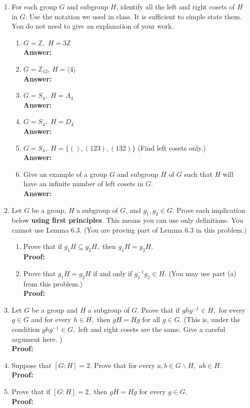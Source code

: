 \documentclass[12pt]{article}
\renewcommand{\emph}[1]{\textsf{\textbf{#1}}}
\newcommand{\bbZ}{\mathbb{Z}}
\begin{document}
\begin{enumerate}
\item For each group $G$ and subgroup $H$, identify all the left and right cosets of $H$ in $G$. Use the notation we used in class. It is sufficient to simple state them. You do not need to give an explanation of your work.\\
	\begin{enumerate}
	\item $G=\bbZ,$ $H=3\bbZ$\\
	\textbf{Answer:} 
	\vfill
	\item $G=\bbZ_{12}$, $H=\langle 4 \rangle$\\
	\textbf{Answer:} 
	\vfill
	\item $G=S_4,$ $H=A_4$\\
	\textbf{Answer:} 
	\vfill
	\item  $G=S_4,$ $H=D_4$\\
	\textbf{Answer:} 
	\vfill
	\item $G=S_4,$ $H=\{(),(123),(132)\}$ (Find left cosets only.)\\
	\textbf{Answer:} 
	\vfill
	\item Give an example of a group $G$ and subgroup $H$ of $G$ such that $H$ will have an infinite number of left cosets in $G.$\\
	\textbf{Answer:} 
	\vfill
	\end{enumerate}
\newpage
	
\item Let $G$ be a group, $H$ a subgroup of $G$, and $g_1,g_2 \in G.$ Prove each implication below \emph{using first principles}. This means you can use only definitions. You cannot use Lemma 6.3. (You are proving part of Lemma 6.3 in this problem.)
	\begin{enumerate}
	\item Prove that if $g_1H \subseteq g_2H,$ then $g_1H=g_2H.$\\
	\textbf{Proof:} 
	\vfill
	\item Prove that $g_1H = g_2H$ if and only if $g_1^{-1}g_2 \in H.$ (You may use part (a) from this problem.)\\
	\textbf{Proof:} 
	\vfill
	\end{enumerate}
\newpage

\item Let $G$ be a group and $H$ a subgroup of $G.$ Prove that if $ghg^{-1} \in H,$ for every $g \in G$ and for every $h \in H,$ then $gH=Hg$ for all $g \in G.$ (This is, under the condition $ghg^{-1} \in G,$ left and right cosets are the same. Give a careful argument here. )\\
\textbf{Proof:} 
	\vfill
\newpage
\item Suppose that $[G : H]=2.$ Prove that for every $a,b \in G\backslash H,$ $ab \in H.$\\
\textbf{Proof:} 
	\vfill
\item Prove that if $[G : H]=2,$ then $gH=Hg$ for every $g \in G.$\\
\textbf{Proof:} 
	\vfill
\newpage
\end{enumerate}
\end{document}
